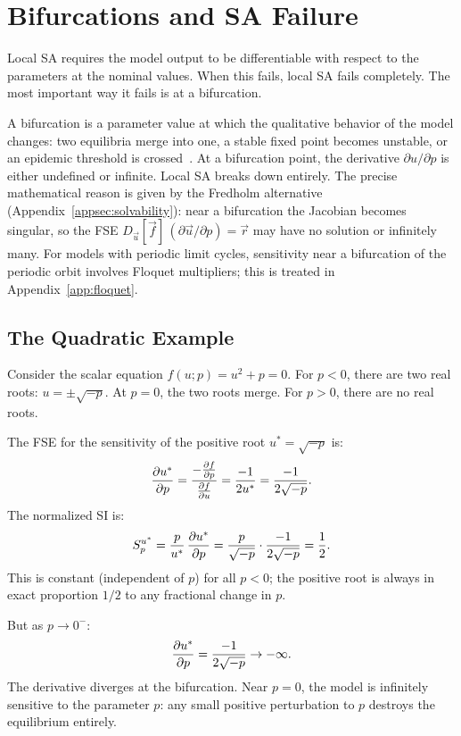 \section{Bifurcations and SA Failure}
\label{sec:bifurcations}

Local SA requires the model output to be differentiable with respect
to the parameters at the nominal values. When this fails, local SA
fails completely. The most important way it fails is at a bifurcation.

A bifurcation is a parameter value at which the qualitative behavior
of the model changes: two equilibria merge into one, a stable fixed
point becomes unstable, or an epidemic threshold is crossed~\cite{strogatz2018nonlinear,kuznetsov2004elements}.
At a bifurcation point, the derivative $\partial u/\partial p$ is
either undefined or infinite. Local SA breaks down entirely.
The precise mathematical reason is given by the Fredholm alternative
(Appendix~\ref{appsec:solvability}): near a bifurcation the Jacobian
becomes singular, so the FSE $D_{\vec{u}}[\vec{f}]\,(\partial\vec{u}/\partial p) = \vec{r}$
may have no solution or infinitely many.
For models with periodic limit cycles, sensitivity near a bifurcation
of the periodic orbit involves Floquet multipliers; this is treated
in Appendix~\ref{app:floquet}.

\subsection{The Quadratic Example}

Consider the scalar equation $f(u; p) = u^2 + p = 0$.
For $p < 0$, there are two real roots: $u = \pm\sqrt{-p}$.
At $p = 0$, the two roots merge. For $p > 0$, there are no real roots.

The FSE for the sensitivity of the positive root $u^* = \sqrt{-p}$ is:
\[
  \frac{\partial u^*}{\partial p} = \frac{-\frac{\partial f}{\partial p}}{\frac{\partial f}{\partial u}} = \frac{-1}{2u^*}
              = \frac{-1}{2\sqrt{-p}}.
\]
The normalized SI is:
\[
  S_{p}^{u^*} = \frac{p}{u^*}\,\frac{\partial u^*}{\partial p}
              = \frac{p}{\sqrt{-p}}\cdot\frac{-1}{2\sqrt{-p}}
              = \frac{1}{2}.
\]
This is constant (independent of $p$) for all $p < 0$;
the positive root is always in exact proportion $1/2$ to any
fractional change in $p$.

But as $p \to 0^-$:
\[
  \frac{\partial u^*}{\partial p} = \frac{-1}{2\sqrt{-p}} \to -\infty.
\]
The derivative diverges at the bifurcation. Near $p = 0$, the
model is infinitely sensitive to the parameter $p$: any small
positive perturbation to $p$ destroys the equilibrium entirely.

